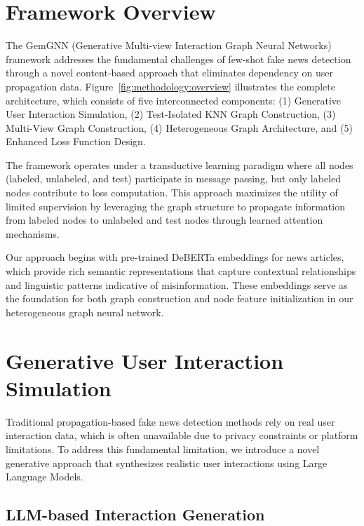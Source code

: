
\section{Framework Overview}

The GemGNN (Generative Multi-view Interaction Graph Neural Networks) framework addresses the fundamental challenges of few-shot fake news detection through a novel content-based approach that eliminates dependency on user propagation data. Figure~\ref{fig:methodology:overview} illustrates the complete architecture, which consists of five interconnected components: (1) Generative User Interaction Simulation, (2) Test-Isolated KNN Graph Construction, (3) Multi-View Graph Construction, (4) Heterogeneous Graph Architecture, and (5) Enhanced Loss Function Design.

The framework operates under a transductive learning paradigm where all nodes (labeled, unlabeled, and test) participate in message passing, but only labeled nodes contribute to loss computation. This approach maximizes the utility of limited supervision by leveraging the graph structure to propagate information from labeled nodes to unlabeled and test nodes through learned attention mechanisms.

Our approach begins with pre-trained DeBERTa embeddings for news articles, which provide rich semantic representations that capture contextual relationships and linguistic patterns indicative of misinformation. These embeddings serve as the foundation for both graph construction and node feature initialization in our heterogeneous graph neural network.

\section{Generative User Interaction Simulation}

Traditional propagation-based fake news detection methods rely on real user interaction data, which is often unavailable due to privacy constraints or platform limitations. To address this fundamental limitation, we introduce a novel generative approach that synthesizes realistic user interactions using Large Language Models.

\subsection{LLM-based Interaction Generation}

